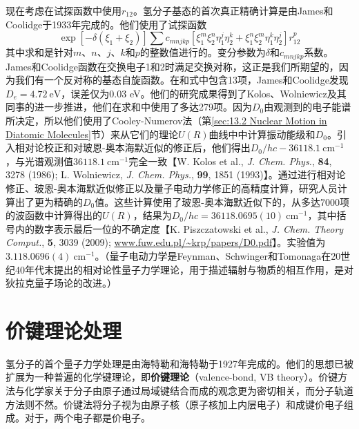     现在考虑在试探函数中使用$r_{12}$。氢分子基态的首次真正精确计算是由James和Coolidge于1933年完成的。他们使用了试探函数
    \begin{equation*}
        \exp\left[-\delta (\xi_1 + \xi_2)\right] \sum c_{mnjkp} \left[ \xi_1^m \xi_2^n \eta_1^j \eta_2^k + \xi_1^n \xi_2^m \eta_1^k \eta_2^j \right] r_{12}^p
    \end{equation*}
    其中求和是针对$m$、$n$、$j$、$k$和$p$的整数值进行的。变分参数为$\delta$和$c_{mnjkp}$系数。James和Coolidge函数在交换电子1和2时满足交换对称，这正是我们所期望的，因为我们有一个反对称的基态自旋函数。在和式中包含13项，James和Coolidge发现$D_e = 4.72\:\mathrm{eV}$，误差仅为0.03 eV。他们的研究成果得到了Kolos、Wolniewicz及其同事的进一步推进，他们在求和中使用了多达279项。因为$D_0$由观测到的电子能谱所决定，所以他们使用了Cooley-Numerov法（第\ref{sec:13.2 Nuclear Motion in Diatomic Molecules}节）来从它们的理论$U\left(R\right)$曲线中中计算振动能级和$D_0$。引入相对论校正和对玻恩-奥本海默近似的修正后，他们得出$D_0/hc - 36118.1\:\mathrm{cm}^{-1}$，与光谱观测值$36118.1\:\mathrm{cm}^{-1}$完全一致【W. Kolos et al., \textit{J. Chem. Phys.}, \textbf{84}, 3278 (1986); L. Wolniewicz, \textit{J. Chem. Phys.}, \textbf{99}, 1851 (1993)】。通过进行相对论修正、玻恩-奥本海默近似修正以及量子电动力学修正的高精度计算，研究人员计算出了更为精确的$D_0$值。这些计算使用了玻恩-奥本海默近似下的，从多达7000项的波函数中计算得出的$U\left(R\right)$，结果为$D_0/hc = 36118.0695(10)\:\mathrm{cm}^{-1}$，其中括号内的数字表示最后一位的不确定度【K. Piszczatowski et al., \textit{J. Chem. Theory Comput.}, \textbf{5}, 3039 (2009); \url{www.fuw.edu.pl/~krp/papers/D0.pdf}】。实验值为$3.118.0696(4)\:\mathrm{cm}^{-1}$。（量子电动力学是Feynman、Schwinger和Tomonaga在20世纪40年代末提出的相对论性量子力学理论，用于描述辐射与物质的相互作用，是对狄拉克量子场论的改进。）

\section{价键理论处理}
\label{sec:13.10 The Valence-Bond Treatment of H2}

    氢分子的首个量子力学处理是由海特勒和海特勒于1927年完成的。他们的思想已被扩展为一种普遍的化学键理论，即\textbf{价键理论}（valence-bond, VB theory）。价键方法与化学家关于分子由原子通过局域键结合而成的观念更为密切相关，而分子轨道方法则不然。价键法将分子视为由原子核（原子核加上内层电子）和成键价电子组成。对于，两个电子都是价电子。

